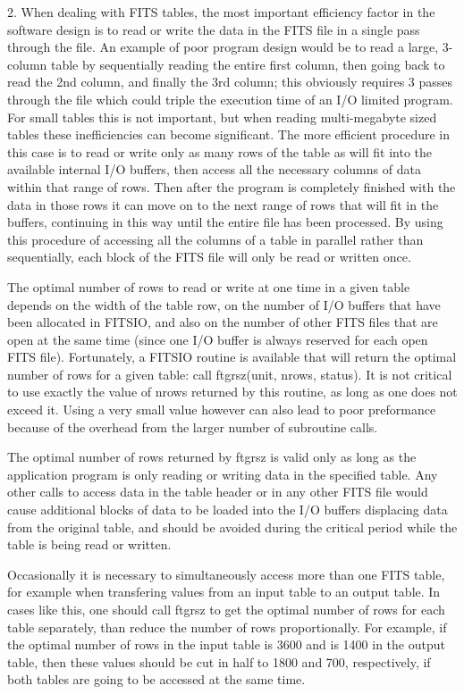 \documentclass[11pt]{book}
\begin{document}
2.  When dealing with FITS tables, the most important efficiency factor
in the software design is to read or write the data in the FITS file in
a single pass through the file.  An example of poor program design
would be to read a large, 3-column table by sequentially reading the
entire first column, then going back to read the 2nd column, and
finally the 3rd column; this obviously requires 3 passes through the
file which could triple the execution time of an I/O limited program.
For small tables this is not important, but when reading multi-megabyte
sized tables these inefficiencies can become significant.  The more
efficient procedure in this case is to read or write only as many rows
of the table as will fit into the available internal I/O buffers, then
access all the necessary columns of data within that range of rows.
Then after the program is completely finished with the data in those
rows it can move on to the next range of rows that will fit in the
buffers, continuing in this way until the entire file has been
processed.  By using this procedure of accessing all the columns of a
table in parallel rather than sequentially, each block of the FITS file
will only be read or written once.

The optimal number of rows to read or write at one time in a given
table depends on the width of the table row, on the number of I/O
buffers that have been allocated in FITSIO, and also on the number of
other FITS files that are open at the same time (since one I/O buffer
is always reserved for each open FITS file).  Fortunately, a FITSIO
routine is available that will return the optimal number of rows for a
given table:  call ftgrsz(unit, nrows, status).  It is not critical to
use exactly the value of nrows returned by this routine, as long as one
does not exceed it.  Using a very small value however can also lead to
poor preformance because of the overhead from the larger number of
subroutine calls.

The optimal number of rows returned by ftgrsz is valid only as long as
the application program is only reading or writing data in the
specified table.  Any other calls to access data in the table header or
in any other FITS file would  cause additional blocks of data to be
loaded into the I/O buffers displacing data from the original table,
and should be avoided during the critical period while the table is
being read or written.

Occasionally it is necessary to simultaneously access more than one
FITS table, for example when transfering values from an input table to
an output table.  In cases like this, one should call ftgrsz to get the
optimal number of rows for each table separately, than reduce the
number of rows proportionally.  For example, if the optimal number of
rows in the input table is 3600 and is 1400 in the output table, then
these values should be cut in half to 1800 and 700, respectively, if
both tables are going to be accessed at the same time.
\end{document}
